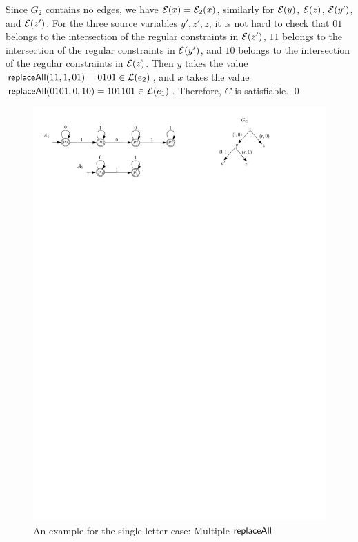\begin{example}
\begin{itemize}
%
\end{itemize}
Since $G_2$ contains no edges, we have $\mathcal{E}(x)=\mathcal{E}_2(x)$, similarly for $\mathcal{E}(y)$, $\mathcal{E}(z)$, $\mathcal{E}(y')$, and $\mathcal{E}(z')$.
For the three source variables $y', z', z$, it is not hard to check that $01$ belongs to the intersection of the regular constraints in $\mathcal{E}(z')$, $11$ belongs to the intersection of the regular constraints in $\mathcal{E}(y')$, and $10$ belongs to the intersection of the regular constraints in $\mathcal{E}(z)$. Then $y$ takes the value $\mathsf{replaceAll}(11, 1, 01)=0101 \in \mathcal{L}(e_2)$, and $x$ takes the value $\mathsf{replaceAll}(0101, 0, 10)=101101 \in \mathcal{L}(e_1)$. Therefore, $C$ is satisfiable. \qed
\begin{figure}[htbp]
\begin{center}
\includegraphics[scale=0.7]{single-letter-example-nested.pdf}
\end{center}
\caption{An example for the single-letter case: Multiple $\mathsf{replaceAll}$}\label{fig-sl-exmp-nested}
\end{figure}


\end{example}
